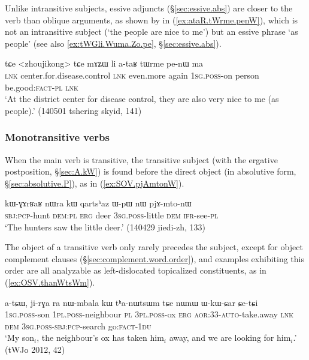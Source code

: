Unlike intransitive subjects, essive adjuncts (§\ref{sec:essive.abs}) are closer to the verb than oblique arguments, as shown by  in (\ref{ex:ataR.tWrme.penW}), which is not an intransitive subject (`the people are nice to me') but an essive phrase `as people' (see also \ref{ex:tWGli.Wuma.Zo.pe}, §\ref{sec:essive.abs}).

\begin{exe}
\ex \label{ex:ataR.tWrme.penW}
\gll tɕe <zhoujikong> tɕe mɤʑɯ li a-taʁ tɯrme pe-nɯ ma \\
\textsc{lnk} center.for.disease.control \textsc{lnk} even.more again \textsc{1sg}.\textsc{poss}-on person be.good:\textsc{fact}-\textsc{pl} \textsc{lnk} \\
\glt `At the district center for disease control, they are also very nice to me (as people).' (140501 tshering skyid, 141)
\end{exe}

 
\subsubsection{Monotransitive verbs} \label{sec:monotransitive.word.order}
When the main verb is transitive, the transitive subject (with the ergative postposition, §\ref{sec:A.kW}) is found before the direct object (in absolutive form, §\ref{sec:absolutive.P}), as in (\ref{ex:SOV.pjAmtonW}). 

\begin{exe}
\ex \label{ex:SOV.pjAmtonW}
\gll kɯ-ɣɤrʁaʁ nɯra kɯ qartsʰaz ɯ-pɯ nɯ pjɤ-mto-nɯ \\
\textsc{sbj}:\textsc{pcp}-hunt \textsc{dem}:\textsc{pl} \textsc{erg} deer \textsc{3sg}.\textsc{poss}-little \textsc{dem} \textsc{ifr}-see-\textsc{pl} \\
\glt `The hunters saw the little deer.' (140429 jiedi-zh, 133)
\end{exe}

The object of a transitive verb only rarely precedes the subject, except for object complement clauses (§\ref{sec:complement.word.order}), and examples exhibiting this order are all analyzable as left-dislocated topicalized constituents, as in (\ref{ex:OSV.thanWtsWm}).

\begin{exe}
\ex \label{ex:OSV.thanWtsWm}
\gll a-tɕɯ, ji-rɣa ra nɯ-mbala kɯ tʰa-nɯtsɯm tɕe nɯnɯ ɯ-kɯ-ɕar ɕe-tɕi \\
\textsc{1sg}.\textsc{poss}-son \textsc{1pl}.\textsc{poss}-neighbour \textsc{pl} \textsc{3pl}.\textsc{poss}-ox \textsc{erg} \textsc{aor}:3\fl{}3-\textsc{auto}-take.away \textsc{lnk} \textsc{dem} \textsc{3sg}.\textsc{poss}-\textsc{sbj}:\textsc{pcp}-search go:\textsc{fact}-\textsc{1du} \\
\glt `My son$_i$, the neighbour's ox has taken him$_i$ away, and we are looking for him$_i$.' (tWJo 2012, 42)
\end{exe}

